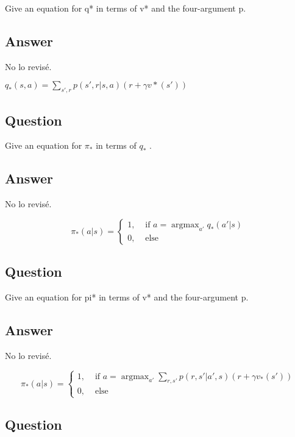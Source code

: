 \documentclass[11pt]{article}
\DeclareMathOperator*{\argmax}{argmax}
\def\red{\color{red}}
\begin{document}
    Give an equation for q* in terms of v* and the four-argument p.

    \subsection*{Answer}
    {\red No lo revisé.}

    $ q_{*}(s, a) = \sum_{s', r} p(s', r | s, a) ( r + \gamma v*(s') ) $

    \subsection{Question}

    Give an equation for $ \pi_{*} $ in terms of $ q_* $ .

    \subsection*{Answer}
    {\red No lo revisé.}

    \begin{equation}
        \pi_*(a|s) =
        \begin{cases}
            1,& \text{ if } a = \argmax_{a'}q_{*}(a'|s) \\
            0,& \text{ else }
        \end{cases}
    \end{equation}

    \subsection{Question}

    Give an equation for pi* in terms of v* and the four-argument p.

    \subsection*{Answer}
    {\red No lo revisé.}

    \begin{equation}
        \pi_*(a|s) =
        \begin{cases}
            1,& \text{ if } a = \argmax_{a'} \sum_{r,s'} p(r, s'| a', s)(r + \gamma v_*(s')) \\
            0,& \text{ else }
        \end{cases}
    \end{equation}

    \subsection{Question}
\end{document}
